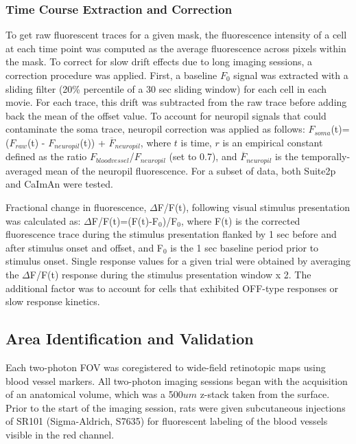 \subsubsection{Time Course Extraction and Correction}
To get raw fluorescent traces for a given mask, the fluorescence intensity of a cell at each time point was computed as the average fluorescence across pixels within the mask. To correct for slow drift effects due to long imaging sessions, a correction procedure was applied. First, a baseline $F_0$ signal was extracted with a sliding filter (20\% percentile of a 30 sec sliding window) for each cell in each movie. For each trace, this drift was subtracted from the raw trace before adding back the mean of the offset value. 
To account for neuropil signals that could contaminate the soma trace, neuropil correction was applied as follows: $F_{soma}$(t)=($F_{raw}$(t) - $F_{neuropil}$(t)) + $\overline{F}_{neuropil}$, where $t$ is time, $r$ is an empirical constant defined as the ratio $F_{bloodvessel}$/$F_{neuropil}$ (set to 0.7), and $\overline{F}_{neuropil}$ is the temporally-averaged mean of the neuropil fluorescence\cite{Liang2018, Kerlin2010}. For a subset of data, both Suite2p and CaImAn were tested.

Fractional change in fluorescence, $\Delta$F/F(t), following visual stimulus presentation was calculated as: $\Delta$F/F(t)=(F(t)-F$_0$)/F$_0$, where F(t) is the corrected fluorescence trace during the stimulus presentation flanked by 1 sec before and after stimulus onset and offset, and F$_0$ is the 1 sec baseline period prior to stimulus onset. Single response values for a given trial were obtained by averaging the $\Delta$F/F(t) response during the stimulus presentation window x 2. The additional factor was to account for cells that exhibited OFF-type responses or slow response kinetics. 

\subsection{Area Identification and Validation}
Each two-photon FOV was coregistered to wide-field retinotopic maps using blood vessel markers. All two-photon imaging sessions began with the acquisition of an anatomical volume, which was a  500$um$ z-stack taken from the surface. Prior to the start of the imaging session, rats were given subcutaneous injections of SR101 (Sigma-Aldrich, S7635) for fluorescent labeling of the blood vessels visible in the red channel. 

